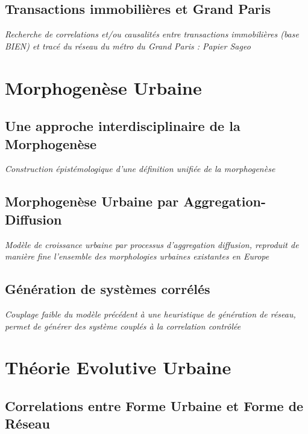 \subsection{Transactions immobilières et Grand Paris}

\textit{Recherche de correlations et/ou causalités entre transactions immobilières (base BIEN) et tracé du réseau du métro du Grand Paris : Papier Sageo}


\section{Morphogenèse Urbaine}

\subsection{Une approche interdisciplinaire de la Morphogenèse}

\textit{Construction épistémologique d'une définition unifiée de la morphogenèse~\cite{antelope2016interdisciplinary}}


\subsection{Morphogenèse Urbaine par Aggregation-Diffusion}

\textit{Modèle de croissance urbaine par processus d'aggregation diffusion, reproduit de manière fine l'ensemble des morphologies urbaines existantes en Europe} 


\subsection{Génération de systèmes corrélés}

\textit{Couplage faible du modèle précédent à une heuristique de génération de réseau, permet de générer des système couplés à la correlation contrôlée~\cite{raimbault2016generation}}


\section{Théorie Evolutive Urbaine}

\subsection{Correlations entre Forme Urbaine et Forme de Réseau}

